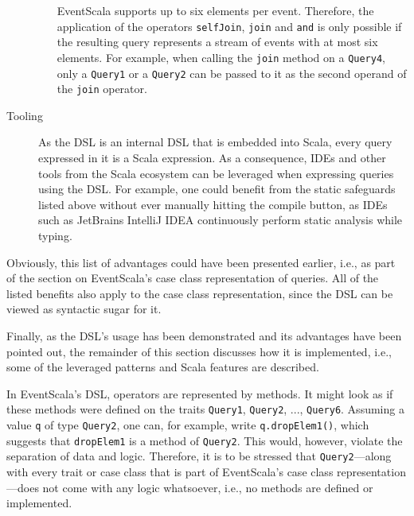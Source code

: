 \documentclass[article, 10pt, type=bsc, colorback, accentcolor=tud8b, parskip=half, bibliography=totocnumbered]{tudthesis}
\begin{document}
\begin{description}
\begin{itemize}
EventScala supports up to six elements per event.
Therefore, the application of the operators \lstinline{selfJoin}, \lstinline{join} and \lstinline{and} is only possible if the resulting query represents a stream of events with at most six elements.
For example, when calling the \lstinline{join} method on a \lstinline{Query4}, only a \lstinline{Query1} or a \lstinline{Query2} can be passed to it as the second operand of the \lstinline{join} operator.
\end{itemize}
\item[Tooling]
As the DSL is an internal DSL that is embedded into Scala, every query expressed in it is a Scala expression.
As a consequence, IDEs and other tools from the Scala ecosystem can be leveraged when expressing queries using the DSL.
For example, one could benefit from the static safeguards listed above without ever manually hitting the compile button, as IDEs such as JetBrains IntelliJ IDEA \cite{idea} continuously perform static analysis while typing.
\end{description}

Obviously, this list of advantages could have been presented earlier, i.e., as part of the section on EventScala's case class representation of queries.
All of the listed benefits also apply to the case class representation, since the DSL can be viewed as syntactic sugar for it.

Finally, as the DSL's usage has been demonstrated and its advantages have been pointed out, the remainder of this section discusses how it is implemented, i.e., some of the leveraged patterns and Scala features are described.

In EventScala's DSL, operators are represented by methods.
It might look as if these methods were defined on the traits \lstinline{Query1}, \lstinline{Query2}, ..., \lstinline{Query6}.
Assuming a value \lstinline{q} of type \lstinline{Query2}, one can, for example, write \lstinline{q.dropElem1()}, which suggests that \lstinline{dropElem1} is a method of \lstinline{Query2}.
This would, however, violate the separation of data and logic.
Therefore, it is to be stressed that \lstinline{Query2}---along with every trait or case class that is part of EventScala's case class representation---does not come with any logic whatsoever, i.e., no methods are defined or implemented.
\end{document}
